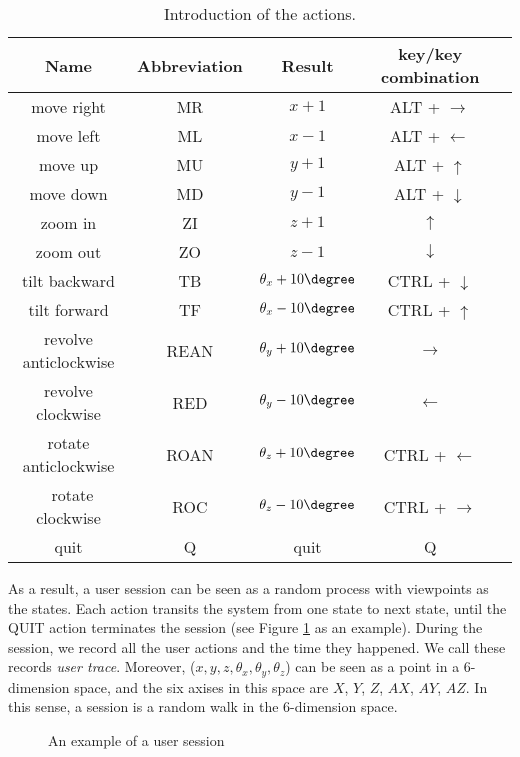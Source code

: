 \begin{table}
    \centering
    \begin{tabular}{|c|c|c|c|c|}
        \hline
        Name & Abbreviation & Result & key/key combination \\
        \hline
        move right & MR     & $x + 1$  & ALT + $\rightarrow$\\
        move left  & ML     & $x - 1$  & ALT + $\leftarrow$\\
        move up    & MU     & $y + 1$  & ALT + $\uparrow$\\
        move down  & MD     & $y - 1$  & ALT + $\downarrow$\\
        zoom in    & ZI     & $z + 1$  & $\uparrow$\\
        zoom out   & ZO     & $z - 1$  & $\downarrow$\\
        tilt backward & TB  & $\theta_x + 10\degree$ & CTRL + $\downarrow$\\
        tilt forward & TF   & $\theta_x - 10\degree$ & CTRL + $\uparrow$\\
        revolve anticlockwise & REAN & $\theta_y + 10\degree$ & $\rightarrow$\\
        revolve clockwise & RED & $\theta_y - 10\degree$ & $\leftarrow$\\
        rotate  anticlockwise & ROAN & $\theta_z + 10\degree$ & CTRL + $\leftarrow$\\\
        rotate  clockwise & ROC &  $\theta_z - 10\degree$ & CTRL + $\rightarrow$\\
        quit       & Q      & quit     & Q \\
        \hline
    \end{tabular}
    \caption{Introduction of the actions.}\label{t:user:action}
\end{table}


As a result, a user session can be seen as a random process 
with viewpoints as the states. Each action transits
the system from one state to next state, until the QUIT
action terminates the session (see Figure \ref{f:user:transition} as an example). 
During the session, we record
all the user actions and the time they happened.  We call these 
records \textit{user trace}.
Moreover, ($x, y, z, \theta_x, \theta_y, \theta_z$) can be seen as a point in a 6-dimension space, and
the six axises in this space are $X$, $Y$, $Z$, $AX$, $AY$, $AZ$. 
In this sense, a session is a random walk in the 6-dimension space.
\begin{figure}
    \centering
    \caption{An example of a user session}
    \label{f:user:transition}
\end{figure}


